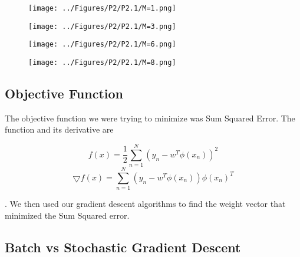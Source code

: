 \documentclass[a4paper,twoside]{article}
\begin{document}
\begin{figure}[h]
  \texttt{[image: ../Figures/P2/P2.1/M=1.png]}
  \caption{}
  \label{fig:gradient_converging}
\end{figure}

\begin{figure}[h]
  \texttt{[image: ../Figures/P2/P2.1/M=3.png]}
  \caption{}
  \label{fig:gradient_converging}
\end{figure}

\begin{figure}[h]
  \texttt{[image: ../Figures/P2/P2.1/M=6.png]}
  \caption{}
  \label{fig:gradient_converging}
\end{figure}

\begin{figure}[h]
  \texttt{[image: ../Figures/P2/P2.1/M=8.png]}
  \caption{}
  \label{fig:gradient_converging}
\end{figure}

\subsection{Objective Function}

The objective function we were trying to minimize was Sum Squared Error. The function and its derivative are 

\begin{equation}
f(x) = \frac{1}{2} \sum_{n=1}^{N} (y_n - w^T \phi(x_n))^2
\end{equation}
\begin{equation}
\bigtriangledown f(x) = \sum_{n=1}^{N} (y_n - w^T \phi(x_n)) \phi(x_n)^T
\end{equation}

. We then used our gradient descent algorithms to find the weight vector that minimized the Sum Squared error. 

\subsection{Batch vs Stochastic Gradient Descent}
\end{document}
